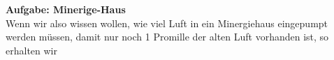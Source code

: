 \textbf{Aufgabe: Minerige-Haus}\\
Wenn wir also wissen wollen, wie viel Luft in ein Minergiehaus
eingepumpt werden müssen, damit nur noch 1 Promille der alten Luft
vorhanden ist, so erhalten wir


\newpage
